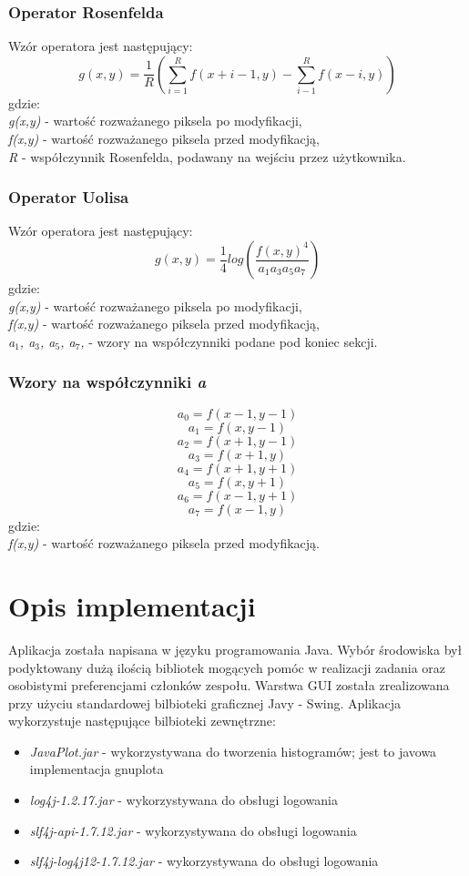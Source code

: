 \documentclass{classrep}
\begin{document}
\subsubsection{Operator Rosenfelda}
Wzór operatora jest następujący:
\[ g(x,y) = \frac{1}{R}(\sum^R_{i=1} f(x + i - 1, y) - \sum^R_{i-1} f(x - i, y))  \]
gdzie:\\
\textit{g(x,y)} - wartość rozważanego piksela po modyfikacji,\\
\textit{f(x,y)} - wartość rozważanego piksela przed modyfikacją,\\
\textit{R} - współczynnik Rosenfelda, podawany na wejściu przez użytkownika.

\subsubsection{Operator Uolisa}
Wzór operatora jest następujący:
\[ g(x,y) = \frac{1}{4} log(\frac{f(x,y)^4}{a_1a_3a_5a_7})  \]
gdzie:\\
\textit{g(x,y)} - wartość rozważanego piksela po modyfikacji,\\
\textit{f(x,y)} - wartość rozważanego piksela przed modyfikacją,\\
\textit{a$_{\text{1}}$, a$_{\text{3}}$, a$_{\text{5}}$, a$_{\text{7}}$,} - wzory na współczynniki podane pod koniec sekcji.\\

\subsubsection{Wzory na współczynniki \textit{a}}
\[ a_0 = f(x - 1, y - 1)\]
\[ a_1 = f(x, y - 1)\]
\[ a_2 = f(x + 1, y - 1)\]
\[ a_3 = f(x + 1, y)\]
\[ a_4 = f(x + 1, y + 1)\]
\[ a_5 = f(x, y + 1)\]
\[ a_6 = f(x - 1, y + 1)\]
\[ a_7 = f(x - 1, y)\]
gdzie:\\
\textit{f(x,y)} - wartość rozważanego piksela przed modyfikacją.\\

\section{Opis implementacji}
Aplikacja została napisana w języku programowania Java. Wybór środowiska był podyktowany dużą ilością bibliotek mogących pomóc w realizacji zadania oraz osobistymi preferencjami członków zespołu. Warstwa GUI została zrealizowana przy użyciu standardowej bilbioteki graficznej Javy - Swing. Aplikacja wykorzystuje następujące bilbioteki zewnętrzne:
\begin{itemize}
\item \textit{JavaPlot.jar} - wykorzystywana do tworzenia histogramów; jest to javowa implementacja gnuplota 
\item \textit{log4j-1.2.17.jar} - wykorzystywana do obsługi logowania
\item \textit{slf4j-api-1.7.12.jar} - wykorzystywana do obsługi logowania
\item \textit{slf4j-log4j12-1.7.12.jar} - wykorzystywana do obsługi logowania
\end{itemize}
\end{document}
